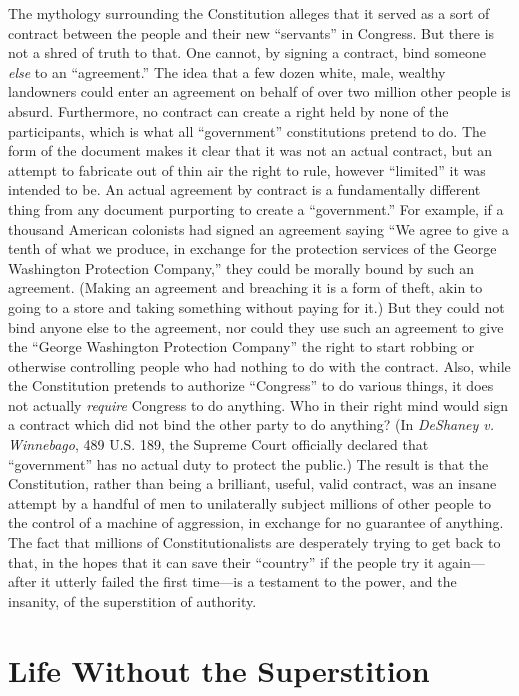 \documentclass{book}
\begin{document}
The mythology surrounding the Constitution alleges that it served as a sort of contract between the people and their new \enquote{servants} in Congress. But there is not a shred of truth to that. One cannot, by signing a contract, bind someone \emph{else} to an \enquote{agreement.} The idea that a few dozen white, male, wealthy landowners could enter an agreement on behalf of over two million other people is absurd. Furthermore, no contract can create a right held by none of the participants, which is what all \enquote{government} constitutions pretend to do. The form of the document makes it clear that it was not an actual contract, but an attempt to fabricate out of thin air the right to rule, however \enquote{limited} it was intended to be. An actual agreement by contract is a fundamentally different thing from any document purporting to create a \enquote{government.} For example, if a thousand American colonists had signed an agreement saying \enquote{We agree to give a tenth of what we produce, in exchange for the protection services of the George Washington Protection Company,} they could be morally bound by such an agreement. (Making an agreement and breaching it is a form of theft, akin to going to a store and taking something without paying for it.) But they could not bind anyone else to the agreement, nor could they use such an agreement to give the \enquote{George Washington Protection Company} the right to start robbing or otherwise controlling people who had nothing to do with the contract. Also, while the Constitution pretends to authorize \enquote{Congress} to do various things, it does not actually \emph{require} Congress to do anything. Who in their right mind would sign a contract which did not bind the other party to do anything? (In \emph{DeShaney v. Winnebago}, 489 U.S. 189, the Supreme Court officially declared that \enquote{government} has no actual duty to protect the public.) The result is that the Constitution, rather than being a brilliant, useful, valid contract, was an insane attempt by a handful of men to unilaterally subject millions of other people to the control of a machine of aggression, in exchange for no guarantee of anything. The fact that millions of Constitutionalists are desperately trying to get back to that, in the hopes that it can save their \enquote{country} if the people try it again---after it utterly failed the first time---is a testament to the power, and the insanity, of the superstition of authority.

\chapter{Life Without the Superstition}
\end{document}

